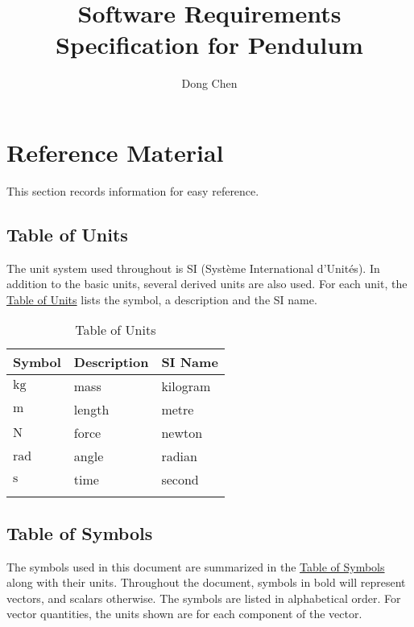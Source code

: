 \documentclass[12pt]{article}
\title{Software Requirements Specification for Pendulum}
\author{Dong Chen}
\begin{document}
\maketitle
\tableofcontents
\newpage
\section{Reference Material}
\label{Sec:RefMat}
This section records information for easy reference.

\subsection{Table of Units}
\label{Sec:ToU}
The unit system used throughout is SI (Système International d'Unités). In addition to the basic units, several derived units are also used. For each unit, the \hyperref[Table:ToU]{Table of Units} lists the symbol, a description and the SI name.

\begin{longtable}{l l l}
\toprule
\textbf{Symbol} & \textbf{Description} & \textbf{SI Name}
\\
\midrule
\endhead
${\text{kg}}$ & mass & kilogram
\\
${\text{m}}$ & length & metre
\\
${\text{N}}$ & force & newton
\\
${\text{rad}}$ & angle & radian
\\
${\text{s}}$ & time & second
\\
\bottomrule
\caption{Table of Units}
\label{Table:ToU}
\end{longtable}
\subsection{Table of Symbols}
\label{Sec:ToS}
The symbols used in this document are summarized in the \hyperref[Table:ToS]{Table of Symbols} along with their units. Throughout the document, symbols in bold will represent vectors, and scalars otherwise. The symbols are listed in alphabetical order. For vector quantities, the units shown are for each component of the vector.
\end{document}
